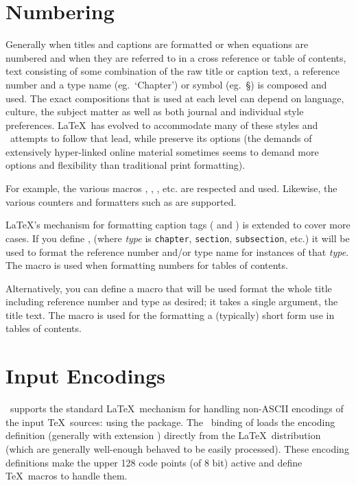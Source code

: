 \documentclass{book}
\begin{document}
\section{Numbering}\label{localization.numbering}
Generally when titles and captions are formatted or when equations are numbered
and when they are referred to in a cross reference or table of contents,
text consisting of some combination of the raw title or caption text,
a reference number and a type name (eg.~`Chapter') or symbol (eg.~\S) is composed and used.
The exact compositions that is used at each level can depend on language, culture,
the subject matter as well as both journal and individual style preferences.
\LaTeX\ has evolved to accommodate many of these styles and
\LaTeXML\ attempts to follow that lead, while preserve its options
(the demands of extensively hyper-linked  online material sometimes seems
to demand more options and flexibility than traditional print formatting).

For example, the various macros , , , etc.
are respected and used.  Likewise, the various counters and formatters such
as  are supported.

\LaTeX's mechanism for formatting caption tags ( and )
is extended to cover more cases.  If you define ,
(where \textit{type} is \texttt{chapter}, \texttt{section}, \texttt{subsection}, etc.)
it will be used to format the reference number and/or type name for instances of that \textit{type}.
The macro  is used when formatting numbers for tables of contents.

Alternatively, you can define a macro   that will be used format the whole
title including reference number and type as desired; it takes a single argument, the title text.
The macro  is used for the formatting a (typically) short form use in tables of contents.


\section{Input Encodings}\label{localization.inputencodings}
\LaTeXML\ supports the standard \LaTeX\ mechanism for handling
non-ASCII encodings of the input \TeX\ sources: using the  package.
The \LaTeXML\ binding of  loads the encoding definition (generally with extension )
directly from the \LaTeX\ distribution (which are generally well-enough behaved to be
easily processed).  These encoding definitions make the upper 128 code points (of 8 bit)
active and define \TeX\ macros to handle them.
\end{document}
